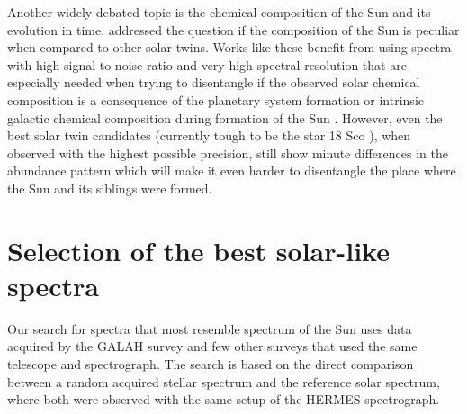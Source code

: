 Another widely debated topic is the chemical composition of the Sun and its evolution in time. \citet{2009A&A...508L..17R, 2015A&A...579A..52N} addressed the question if the composition of the Sun is peculiar when compared to other solar twins. Works like these benefit from using spectra with high signal to noise ratio and very high spectral resolution that are especially needed when trying to disentangle if the observed solar chemical composition is a consequence of the planetary system formation \cite{2014A&A...572A..48R} or intrinsic galactic chemical composition during formation of the Sun \cite{2015A&A...579A..52N, 2016A&A...593A..65N, 2020A&A...633L...9J}. However, even the best solar twin candidates (currently tough to be the star 18 Sco \cite{2014ApJ...791...14M}), when observed with the highest possible precision, still show minute differences in the abundance pattern which will make it even harder to disentangle the place where the Sun and its siblings were formed.


\section{Selection of the best solar-like spectra}
\label{sec:05_selection}
Our search for spectra that most resemble spectrum of the Sun uses data acquired by the GALAH survey and few other surveys that used the same telescope and spectrograph. The search is based on the direct comparison between a random acquired stellar spectrum and the reference solar spectrum, where both were observed with the same setup of the HERMES spectrograph.

